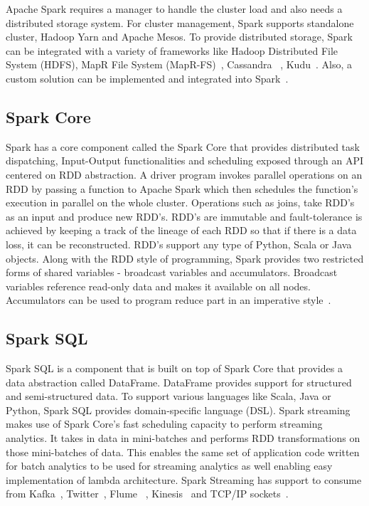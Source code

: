 Apache Spark requires a manager to handle the cluster load and also needs a 
distributed storage system. For cluster management, Spark supports standalone 
cluster, Hadoop Yarn and Apache Mesos. To provide distributed storage, Spark 
can be integrated with a variety of frameworks like Hadoop Distributed File 
System (HDFS), MapR File System (MapR-FS)~\cite{hid-sp18-408-maprfs}, Cassandra
~\cite{hid-sp18-408-cassandra}, Kudu~\cite{hid-sp18-408-kudu}. Also, a custom 
solution can be implemented and integrated into Spark~\cite{hid-sp18-408-Spark}. 

\subsection{Spark Core}
Spark has a core component called the Spark Core that provides distributed task 
dispatching, Input-Output functionalities and scheduling exposed through an API 
centered on RDD abstraction. A driver program invokes parallel operations on an 
RDD by passing a function to Apache Spark which then schedules the function's 
execution in parallel on the whole cluster. Operations such as joins, take RDD's 
as an input and produce new RDD's. RDD's are immutable and fault-tolerance is 
achieved by keeping a track of the lineage of each RDD so that if there is a 
data loss, it can be reconstructed. RDD's support any type of Python, Scala or 
Java objects. Along with the RDD style of programming, Spark provides two 
restricted forms of shared variables - broadcast variables and accumulators. 
Broadcast variables reference read-only data and makes it available on all 
nodes. Accumulators can be used to program reduce part 
in an imperative style~\cite{hid-sp18-408-Spark}. 

\subsection{Spark SQL}
Spark SQL is a component that is built on top of Spark Core that provides a data 
abstraction called DataFrame. DataFrame provides support for structured and 
semi-structured data. To support various languages like Scala, Java or Python, 
Spark SQL provides domain-specific language (DSL). Spark streaming makes use of 
Spark Core's fast scheduling capacity to perform streaming analytics. It takes
in data in mini-batches and performs RDD transformations on those mini-batches 
of data. This enables the same set of application code written for batch 
analytics to be used for streaming analytics as well enabling easy 
implementation of lambda architecture. Spark Streaming has support to consume 
from Kafka~\cite{hid-sp18-408-Kafka}, Twitter~\cite{hid-sp18-408-twitter}, Flume
~\cite{hid-sp18-408-flume}, Kinesis~\cite{hid-sp18-408-kinesis} and TCP/IP 
sockets~\cite{hid-sp18-408-Spark}.

